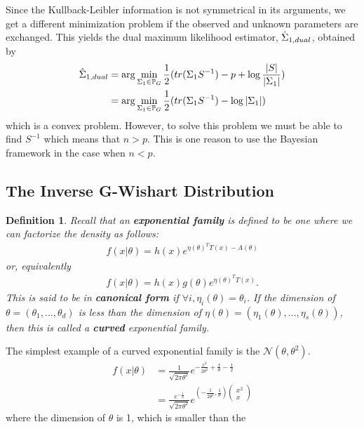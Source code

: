 \documentclass[12pt, leqno]{article}
\providecommand{\abs}[1]{\lvert#1\rvert}
\let\oldhat\hat
\renewcommand{\hat}[1]{\oldhat{{#1}}}
\def\s{\ensuremath\Sigma}
\def\pg{\ensuremath\mathbb{P}_{{G}}}
\newtheorem{defn}[thm]{Definition}
\begin{document}
Since the Kullback-Leibler information is not symmetrical in its
arguments, we get a different minimization problem if the observed
 and unknown parameters are exchanged. This yields the dual maximum
 likelihood estimator, $\hat{\s}_{1,dual} $, obtained by 
\begin{align*}
\hat{\s}_{1,dual} &= \arg\min_{\s_1 \in \pg} \frac{1}{2}(tr( \s_1 S^{-1}
) -p + \log \frac{\abs{S}}{\abs{\s_1}}) \\
&= \arg\min_{\s_1 \in \pg} \frac{1}{2}(tr( \s_1 S^{-1}
) - \log {\abs{\s_1}}) 
\end{align*}
which is a convex problem. However, to solve this problem we must be
able to find $S^{-1}$ which means that $n>p$. This is one reason to
use the Bayesian framework in the case when $n<p$.

\subsection{The Inverse G-Wishart Distribution} 
\begin{defn}
\label{defn:exponential}
Recall that an \textbf{exponential
family} is defined to be one where we can factorize the density as
follows:
\begin{align*}
f(x|\theta) = h(x)e^{\eta(\theta)^T T(x)-A(\theta)}
\end{align*}
or, equivalently 
\begin{align*}
f(x|\theta) = h(x)g(\theta)e^{\eta(\theta)^T T(x)}.
\end{align*}
This is said to be in \textbf{canonical form} if $\forall i, \eta_i(\theta) =
\theta_i$.
If the dimension of $\theta = (\theta_1,...,\theta_d)$ is less than
the dimension of $\eta(\theta) = (\eta_1(\theta),...,\eta_s(\theta))$,
then this is called a \textbf{curved} exponential family.
\end{defn}
The simplest example of a curved exponential family is the
$\mathcal{N}(\theta,\theta^2)$.
\begin{align*}
f(x|\theta) &= \frac{1}{\sqrt{2 \pi
              \theta^2}}e^{-\frac{x^2}{2\theta^2}+\frac{x}{\theta}-\frac{1}{2}}
  \\
&= \frac{e^{-\frac{1}{2}}}{\sqrt{2 \pi
              \theta^2}}e^{(-\frac{1}{2\theta^2},\frac{1}{\theta})\begin{pmatrix}
                x^2\\x\end{pmatrix}}
\end{align*}
where the dimension of $\theta$ is 1, which is smaller than the
\end{document}
